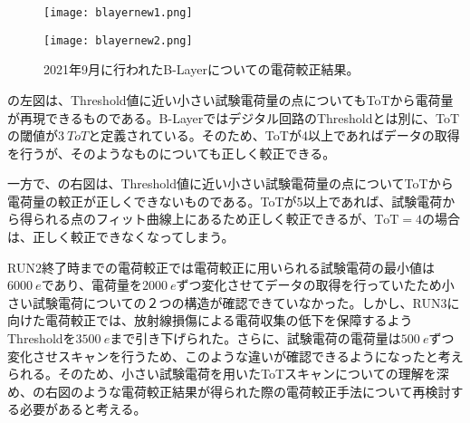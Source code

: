 \begin{figure}[tbp]
  \begin{minipage}[b]{0.5\linewidth}
    \centering
    \texttt{[image: blayernew1.png]}
  \end{minipage}
  \begin{minipage}[b]{0.5\linewidth}
    \centering
    \texttt{[image: blayernew2.png]}
  \end{minipage}
  \caption[2021年9月に行われたB-Layerについての電荷較正結果]{2021年9月に行われたB-Layerについての電荷較正結果。}
  \label{fig:blayernew}
\end{figure}

の左図は、Threshold値に近い小さい試験電荷量の点についてもToTから電荷量が再現できるものである。B-Layerではデジタル回路のThresholdとは別に、ToTの閾値が$3\ \si{ToT}$と定義されている。そのため、ToTが4以上であればデータの取得を行うが、そのようなものについても正しく較正できる。

一方で、の右図は、Threshold値に近い小さい試験電荷量の点についてToTから電荷量の較正が正しくできないものである。ToTが5以上であれば、試験電荷から得られる点のフィット曲線上にあるため正しく較正できるが、$\mathrm{ToT}=4$の場合は、正しく較正できなくなってしまう。

RUN2終了時までの電荷較正では電荷較正に用いられる試験電荷の最小値は$6000\ \si{e}$であり、電荷量を$2000\ \si{e}$ずつ変化させてデータの取得を行っていたため小さい試験電荷についての２つの構造が確認できていなかった。しかし、RUN3に向けた電荷較正では、放射線損傷による電荷収集の低下を保障するようThresholdを$3500\ \si{e}$まで引き下げられた。さらに、試験電荷の電荷量は$500\ \si{e}$ずつ変化させスキャンを行うため、このような違いが確認できるようになったと考えられる。そのため、小さい試験電荷を用いたToTスキャンについての理解を深め、の右図のような電荷較正結果が得られた際の電荷較正手法について再検討する必要があると考える。


\newpage
